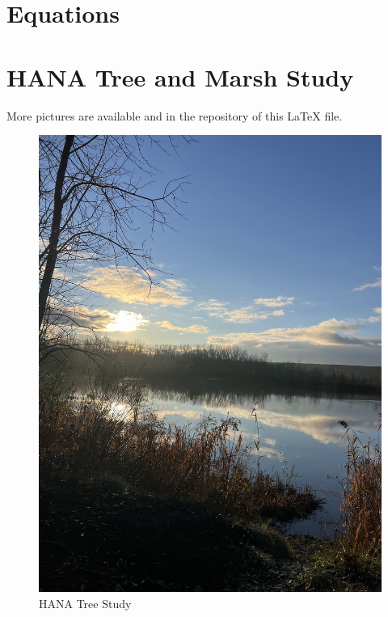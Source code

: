 \documentclass{article}
\begin{document}
\section{Equations}




\section{HANA Tree and Marsh Study}
\clearpage
More pictures are available and in the repository of this LaTeX file. 
\begin{figure}[h!]
\centering
\includegraphics[scale=.1]{Research/HANA/NOV2024/IMG_9791.JPG}
\caption{HANA Tree Study}
\label{fig:HANA}
\end{figure}
\end{document}
